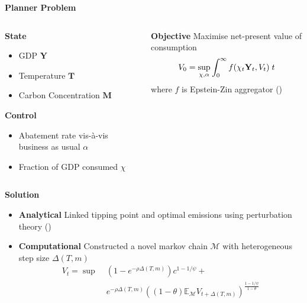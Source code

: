 \documentclass[final]{beamer}
\newlength{\onecolwid}
\newlength{\twocolwid}
\let\d\relax
\newcommand{\d}[1]{\mathrm{d}#1}
\newcommand{\T}{\mathbf{T}}
\newcommand{\M}{\mathbf{M}}
\newcommand{\Y}{\mathbf{Y}}
\begin{document}
\begin{frame}[t]
\begin{columns}[t]
\begin{column}{\twocolwid}
\textbf{\large Planner Problem} \vspace{1em}

\begin{columns}
    \begin{column}{\onecolwid}
        \textbf{State}
        
        \begin{itemize}
            \item GDP $\Y$
            \item Temperature $\T$
            \item Carbon Concentration $\M$
        \end{itemize}
        \textbf{Control}
        \begin{itemize}
            \item Abatement rate vis-à-vis business as usual $\alpha$
            \item Fraction of GDP consumed $\chi$
        \end{itemize}
    \end{column}
    \begin{column}{\onecolwid}
        \textbf{Objective}
        Maximise net-present value of consumption \begin{equation*}
            V_0 = \sup_{\chi, \alpha} \int^\infty_0 f(\chi_t \Y_t, V_t) \; \d{t}
        \end{equation*} where $f$ is Epstein-Zin aggregator (\citeyear{epstein_substitution_1989})
    \end{column}
\end{columns}

\begin{columns}
    \begin{column}{\onecolwid}
        \textbf{\large Solution} \vspace{1em} 
        \begin{itemize}
            \item \textbf{Analytical} Linked tipping point and optimal emissions using perturbation theory (\cite{van_den_bremer_risk-adjusted_2021})
            \item \textbf{Computational} Constructed a novel markov chain $\mathcal{M}$ with heterogeneous step size $\Delta(T, m)$ \begin{equation*}
                \begin{split}
                    V_t = \sup \; &(1 - e^{-\rho \Delta(T, m)}) c^{{1 - 1 / \psi}} + \\ 
                    &e^{-\rho \Delta(T, m)} ((1 - \theta) \mathbb{E}_{\mathcal{M}} V_{t + \Delta(T, m)})^{\frac{1 - 1 / \psi}{1 - \theta}}
                \end{split}
            \end{equation*}
        \end{itemize}


\end{column}
\end{columns}
\end{column}
\end{columns}
\end{frame}
\end{document}
